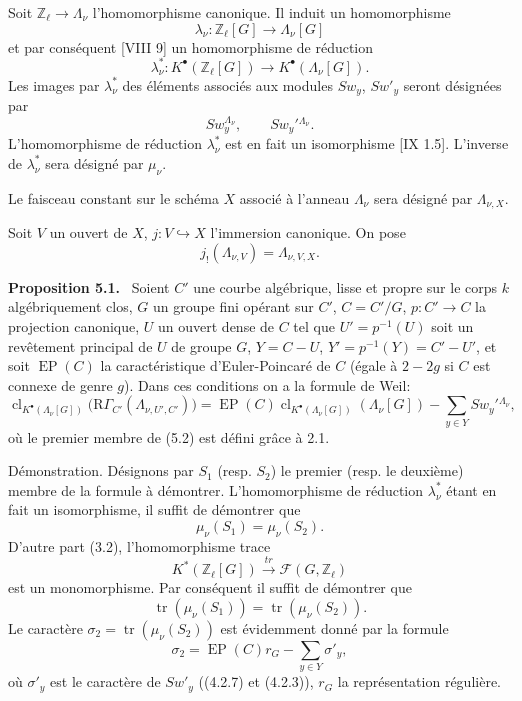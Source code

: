 \documentclass[11pt]{article}
\newenvironment{statement}[1]{\par\medskip\noindent\textbf{#1.}\ }{\par\medskip}
\newcommand{\R}{\mathrm{R}}\newcommand{\RHomCore}{\mathrm{RHom}}
\providecommand{\EP}{\operatorname{EP}}
\providecommand{\R}{\mathrm R}
\providecommand{\EP}{\operatorname{EP}}
\providecommand{\clKstar}[1]{\operatorname{cl}_{K^{\bullet}(#1)}}
\providecommand{\RG}{\R\Gamma}
\begin{document}
Soit $\mathbb Z_\ell\to\Lambda_\nu$ l'homomorphisme canonique. Il induit un homomorphisme
\[
\lambda_\nu:\mathbb Z_\ell[G]\longrightarrow \Lambda_\nu[G]
\]
et par conséquent [VIII 9] un homomorphisme de réduction
\[
\lambda_\nu^*:K^{\bullet}(\mathbb Z_\ell[G])\longrightarrow K^{\bullet}(\Lambda_\nu[G]).
\]
Les images par $\lambda_\nu^*$ des éléments associés aux modules $Sw_y$, $Sw'_y$ seront désignées par
\[
Sw_y^{\Lambda_\nu},\qquad Sw_y'{}^{\Lambda_\nu}.
\]
L'homomorphisme de réduction $\lambda_\nu^*$ est en fait un isomorphisme [IX 1.5]. L'inverse de $\lambda_\nu^*$ sera désigné par $\mu_\nu$.

Le faisceau constant sur le schéma $X$ associé à l'anneau $\Lambda_\nu$ sera désigné par $\Lambda_{\nu,X}$.

Soit $V$ un ouvert de $X$, $j:V\hookrightarrow X$ l'immersion canonique. On pose
\[
j_!(\Lambda_{\nu,V})=\Lambda_{\nu,V,X}.
\]

\begin{statement}{Proposition 5.1}
Soient $C'$ une courbe algébrique, lisse et propre sur le corps $k$ algébriquement clos, $G$ un groupe fini opérant sur $C'$, $C=C'/G$, $p:C'\to C$ la projection canonique, $U$ un ouvert dense de $C$ tel que $U'=p^{-1}(U)$ soit un revêtement principal de $U$ de groupe $G$, $Y=C-U$, $Y'=p^{-1}(Y)=C'-U'$, et soit $\EP(C)$ la caractéristique d'Euler-Poincaré de $C$ (égale à $2-2g$ si $C$ est connexe de genre $g$).
Dans ces conditions on a la formule de Weil:
\[
\clKstar{\Lambda_\nu[G]}\bigl(\RG_{C'}(\Lambda_{\nu,U',C'})\bigr)
=
\EP(C)\clKstar{\Lambda_\nu[G]}(\Lambda_\nu[G])
-\sum_{y\in Y}Sw_y'{}^{\Lambda_\nu},
\tag{5.2}
\]
où le premier membre de (5.2) est défini grâce à 2.1.
\end{statement}

Démonstration. Désignons par $S_1$ (resp. $S_2$) le premier (resp. le deuxième) membre de la formule à démontrer. L'homomorphisme de réduction $\lambda_\nu^*$ étant en fait un isomorphisme, il suffit de démontrer que
\[
\mu_\nu(S_1)=\mu_\nu(S_2).
\]
D'autre part (3.2), l'homomorphisme trace
\[
K^*(\mathbb Z_\ell[G])\xrightarrow{\ tr\ }\mathcal F(G,\mathbb Z_\ell)
\]
est un monomorphisme. Par conséquent il suffit de démontrer que
\[
\operatorname{tr}(\mu_\nu(S_1))=\operatorname{tr}(\mu_\nu(S_2)).
\]
Le caractère $\sigma_2=\operatorname{tr}(\mu_\nu(S_2))$ est évidemment donné par la formule
\[
\sigma_2=\EP(C)r_G-\sum_{y\in Y}\sigma'_y,
\tag{5.2.1}
\]
où $\sigma'_y$ est le caractère de $Sw'_y$ ((4.2.7) et (4.2.3)), $r_G$ la représentation régulière.
\end{document}
